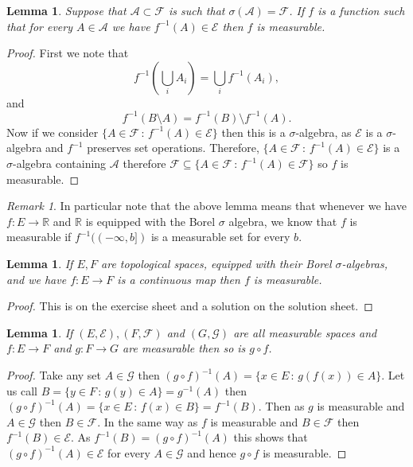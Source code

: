 \documentclass[11pt]{article}
\newtheorem{lem}[thm]{Lemma}
\theoremstyle{definition}
\theoremstyle{remark}
\newtheorem{remark}[thm]{Remark}
\begin{document}
\begin{lem} Suppose that $\mathcal{A} \subset \mathcal{F}$ is such that $\sigma(\mathcal{A})= \mathcal{F}$. If $f$ is a function such that for every $A \in \mathcal{A}$ we have $f^{-1}(A) \in \mathcal{E}$ then $f$ is measurable. 
\end{lem}
\begin{proof}
First we note that
\[ f^{-1}\left( \bigcup_i A_i \right) = \bigcup_i f^{-1}(A_i), \] and
\[ f^{-1}(B \setminus A) = f^{-1}(B) \setminus f^{-1}(A). \] Now if we consider $\{ A \in \mathcal{F} \, :\, f^{-1}(A) \in \mathcal{E}\}$ then this is a $\sigma$-algebra, as $\mathcal{E}$ is a $\sigma$-algebra and $f^{-1}$ preserves set operations. Therefore, $\{ A \in \mathcal{F} \, :\, f^{-1}(A) \in \mathcal{E}\}$ is a $\sigma$-algebra containing $\mathcal{A}$ therefore $\mathcal{F} \subseteq  \{ A \in \mathcal{F} \, :\, f^{-1}(A) \in \mathcal{F}\}$ so $f$ is measurable.
\end{proof}

\begin{remark}
In particular note that the above lemma means that whenever we have $f: E \rightarrow \mathbb{R}$ and $\mathbb{R}$ is equipped with the Borel $\sigma$ algebra, we know that $f$ is measurable if $f^{-1}((-\infty, b])$ is a measurable set for every $b$.
\end{remark}

\begin{lem}
If $E, F$ are topological spaces, equipped with their Borel $\sigma$-algebras, and we have $f:E \rightarrow F$ is a continuous map then $f$ is measurable.
\end{lem}
\begin{proof}
This is on the exercise sheet and a solution on the solution sheet.
\end{proof}

\begin{lem}
If $(E, \mathcal{E}), (F, \mathcal{F})$ and $(G, \mathcal{G})$ are all measurable spaces and $f : E \rightarrow F$ and $g: F \rightarrow G$ are measurable then so is $g \circ f$.
\end{lem}
\begin{proof}
Take any set $A \in \mathcal{G}$ then $(g\circ f)^{-1}(A) = \{ x \in E \,:\, g(f(x))  \in A\}$. Let us call $B = \{y \in F \,:\, g(y) \in A\} = g^{-1}(A)$ then $(g \circ f)^{-1}(A) = \{ x \in E \,:\, f(x) \in B\} = f^{-1}(B)$. Then as $g$ is measurable and $A \in \mathcal{G}$ then $B \in \mathcal{F}$. In the same way as $f$ is measurable and $B \in \mathcal{F}$ then $f^{-1}(B) \in \mathcal{E}$. As $f^{-1}(B) = (g \circ f)^{-1}(A)$ this shows that $(g \circ f)^{-1}(A) \in \mathcal{E}$ for every $A \in \mathcal{G}$ and hence $g \circ f$ is measurable.
\end{proof}
\end{document}
